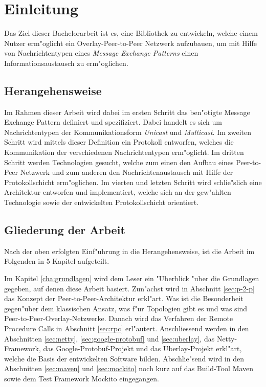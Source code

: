 \chapter{Einleitung}
\label{cha:einleitung}

Das Ziel dieser Bachelorarbeit ist es, eine Bibliothek zu entwickeln, welche einem Nutzer erm"oglicht ein Overlay-Peer-to-Peer Netzwerk aufzubauen, um mit Hilfe von Nachrichtentypen eines \emph{Message Exchange Patterns} einen Informationsaustausch zu erm"oglichen.

\section{Herangehensweise}

Im Rahmen dieser Arbeit wird dabei im ersten Schritt das ben"otigte Message Exchange Pattern definiert und spezifiziert. Dabei handelt es sich um Nachrichtentypen der Kommunikationsform \emph{Unicast} und \emph{Multicast}. Im zweiten Schritt wird mittels dieser Definition ein Protokoll entworfen, welches die Kommunikation der verschiedenen Nachrichtentypen erm"oglicht. Im dritten Schritt werden Technologien gesucht, welche zum einen den Aufbau eines Peer-to-Peer Netzwerk und zum anderen den Nachrichtenaustausch mit Hilfe der Protokollschicht erm"oglichen. Im vierten und letzten Schritt wird schlie"slich eine Architektur entworfen und implementiert, welche sich an der gew"ahlten Technologie sowie der entwickelten Protokollschicht orientiert. 

\section{Gliederung der Arbeit}
Nach der oben erfolgten Einf"uhrung in die Herangehensweise, ist die Arbeit im Folgenden in 5 Kapitel aufgeteilt.

Im Kapitel \ref{cha:grundlagen} wird dem Leser ein "Uberblick "uber die Grundlagen gegeben, auf denen diese Arbeit basiert. Zun"achst wird in Abschnitt \ref{sec:p-2-p} das Konzept der Peer-to-Peer-Architektur erkl"art. Was ist die Besonderheit gegen"uber dem klassischen Ansatz, was f"ur Topologien gibt es und was sind Peer-to-Peer-Overlay-Netzwerke. Danach wird das Verfahren der Remote Procedure Calls in Abschnitt \ref{sec:rpc} erl"autert. Anschliessend werden in den Abschnitten \ref{sec:netty}, \ref{sec:google-protobuf} und \ref{sec:uberlay}, das Netty-Framework, das Google-Protobuf-Projekt und das Uberlay-Projekt erkl"art, welche die Basis der entwickelten Software bilden. Abschlie"send wird in den Abschnitten \ref{sec:maven} und \ref{sec:mockito} noch kurz auf das Build-Tool Maven sowie dem Test Framework Mockito eingegangen.

